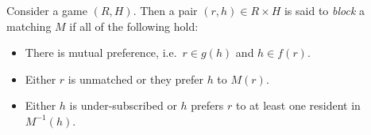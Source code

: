 \begin{definition}\label{def:blocking}
    Consider a game \((R, H)\). Then a pair \((r, h) \in R \times H\) is said to
    \emph{block} a matching \(M\) if all of the following hold:
    \begin{itemize}
        \item There is mutual preference, i.e.\ \(r \in g(h)\) and \(h \in
            f(r)\).
        \item Either \(r\) is unmatched or they prefer \(h\) to \(M(r)\).
        \item Either \(h\) is under-subscribed or \(h\) prefers \(r\) to at
            least one resident in \(M^{-1}(h)\).
    \end{itemize}
\end{definition}

\begin{table}[htbp]
    \caption{A summary of the relationships between the components of the
             initialisation for \(k\)-modes and those in a matching game
             \((R, H)\).
    }\label{tab:components}
\end{table}

%



